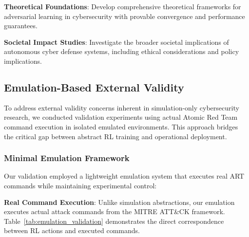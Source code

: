 \documentclass[12pt,twoside]{article}
\theoremstyle{definition}
\theoremstyle{plain}
\begin{document}
\textbf{Theoretical Foundations}: Develop comprehensive theoretical frameworks for adversarial learning in cybersecurity with provable convergence and performance guarantees.

\textbf{Societal Impact Studies}: Investigate the broader societal implications of autonomous cyber defense systems, including ethical considerations and policy implications.


\subsection{Emulation-Based External Validity}

To address external validity concerns inherent in simulation-only cybersecurity research, we conducted validation experiments using actual Atomic Red Team command execution in isolated emulated environments. This approach bridges the critical gap between abstract RL training and operational deployment.

\subsubsection{Minimal Emulation Framework}

Our validation employed a lightweight emulation system that executes real ART commands while maintaining experimental control:

	\textbf{Real Command Execution}: Unlike simulation abstractions, our emulation executes actual attack commands from the MITRE ATT\&CK framework. Table~\ref{tab:emulation_validation} demonstrates the direct correspondence between RL actions and executed commands.
\end{document}
